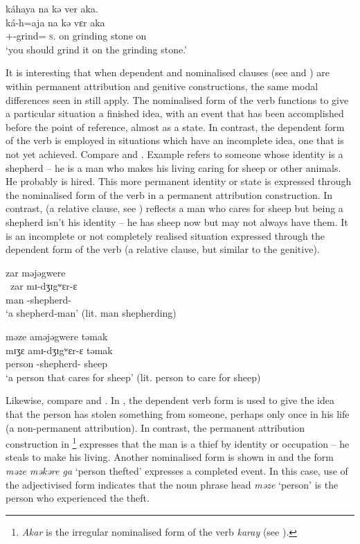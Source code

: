 \medskip
      káhaya  na  kə  ver  aka.\\
\gll  ká-h=aja na kə vɛr aka\\
      {\twoS}+{\IFV}-grind={\PLU}    \textsc{s}.{\DO}     on  {grinding stone}  on\\
\glt  ‘you should grind it on the grinding stone.’
\z

It is interesting that when dependent and nominalised clauses (see  and ) are within permanent attribution  and genitive constructions, the same modal differences seen in  still apply. The nominalised form of the verb functions to give a particular situation a finished idea, with an event that has been accomplished before the point of reference, almost as a state. In contrast, the dependent form of the verb is employed in situations which have an incomplete idea, one that is not yet achieved. Compare  and . Example  refers to someone whose identity is a shepherd -- he is a man who makes his living caring for sheep or other animals. He probably is hired. This more permanent identity or state is expressed through the nominalised form of the verb in a permanent attribution construction. In contrast,  (a relative clause, see ) reflects a man who cares for sheep but being a shepherd isn’t his identity -- he has sheep now but may not always have them. It is an incomplete or not completely realised situation expressed through the dependent form of the verb (a relative clause, but similar to the genitive). 

\ea \label{ex:5:94}
zar  məjəgwere\\
\gll  \ zar     mɪ-dʒɪgʷɛr-ɛ\\
      man    {\NOM}{}-shepherd-{\CL}\\
\glt  ‘a shepherd-man’ (lit. man shepherding)
\z

\largerpage
\ea \label{ex:5:95}
məze  aməjəgwere  təmak\\
\gll  mɪʒɛ   amɪ-dʒɪgʷɛr-ɛ     təmak\\
      person  {\DEP}-shepherd-{\CL}  sheep\\
\glt  ‘a person that cares for sheep’ (lit. person to care for sheep)
\z

Likewise, compare  and . In , the dependent verb form is used to give the idea that the person has stolen something from someone, perhaps only once in his life (a non-permanent attribution).  In contrast, the permanent attribution construction in \footnote{\textit{Akar} is the irregular nominalised form of the verb \textit{karay} (see ).} expresses that the man is a thief by identity or occupation -- he steals to make his living. Another nominalised form is shown in  and the form \textit{məze məkəre  ga} ‘person thefted' expresses a completed event. In this case, use of the adjectivised form indicates that the noun phrase head \textit{məze} ‘person'  is the person who experienced the theft.  

